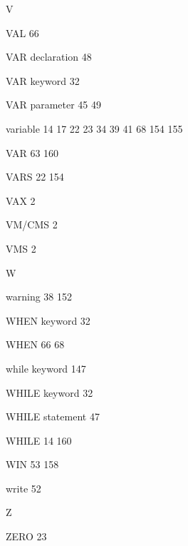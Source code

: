 \item {\Large V}
\item VAL 66
\item VAR declaration 48
\item VAR keyword 32
\item VAR parameter  45 49
\item variable  14 17 22 23 34 39 41 68 154 155
\item VAR  63 160
\item VARS  22 154
\item VAX 2
\item VM/CMS 2
\item VMS 2
\indexspace
\item {\Large W}
\item warning  38 152
\item WHEN keyword 32
\item WHEN  66 68
\item while keyword 147
\item WHILE keyword 32
\item WHILE statement 47
\item WHILE  14 160
\item WIN  53 158
\item write 52
\indexspace
\item {\Large Z}
\item ZERO 23
